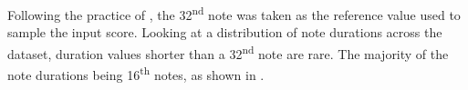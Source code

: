 
Following the practice of \textcite{micchi2020not}, the
32\textsuperscript{nd} note was taken as the reference value
used to sample the input score. Looking at a distribution of
note durations across the dataset, duration values shorter
than a 32\textsuperscript{nd} note are rare. The majority of
the note durations being 16\textsuperscript{th} notes, as
shown in .

